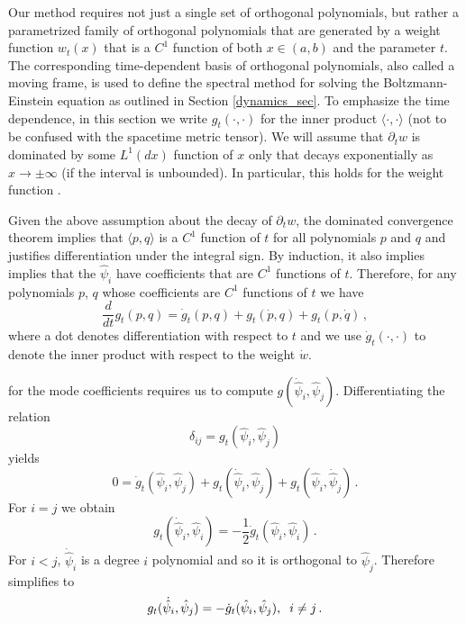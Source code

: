 \label{ortho-polynom-fam}
Our method requires not just a single set of orthogonal polynomials, but rather a parametrized family of orthogonal polynomials that are generated by a weight function $w_t(x)$ that is a $C^1$ function of both $x\in(a,b)$ and the parameter $t$. The corresponding time-dependent basis of orthogonal polynomials, also called a moving frame, is used to define the spectral method for solving the  Boltzmann-Einstein equation as outlined in Section \ref{dynamics_sec}.  To emphasize the time dependence, in this section we write $g_t(\cdot,\cdot)$ for the inner product $\langle\cdot,\cdot\rangle$ (not to be confused with the spacetime metric tensor).  We will assume that $\partial_t w$ is dominated by some $L^1(dx)$ function of $x$ only that decays exponentially as $x\rightarrow\pm\infty$ (if the interval is unbounded). In particular, this holds for the weight function .

Given the above assumption about the decay of $\partial_t w$, the dominated convergence theorem implies that $\langle p,q\rangle$ is a $C^1$ function of $t$ for all polynomials $p$ and $q$ and justifies  differentiation under the integral sign. By induction, it also implies implies that the $\hat\psi_i$ have coefficients that are $C^1$ functions of $t$. Therefore, for any polynomials $p$, $q$ whose coefficients are $C^1$ functions of $t$ we have
\begin{equation}
\frac{d}{dt}g_t( p,q)=\dot{g}_t(p,q)+g_t(\dot{p},q)+g_t( p,\dot{q})\,,
\end{equation}
where a dot denotes differentiation with respect to $t$ and we use $\dot{g}_t(\cdot,\cdot)$ to denote the inner product with respect to the weight $\dot{w}$.  

 for the mode coefficients requires us to compute $g(\dot{\hat\psi}_i,\hat\psi_j)$.  Differentiating the relation
\begin{equation}
\delta_{ij}=g_t(\hat\psi_i,\hat\psi_j)
\end{equation}
yields
\begin{equation}\label{ortho_deriv_eq}
0=\dot g_t(\hat\psi_i,\hat\psi_j)+g_t(\dot{\hat\psi}_i,\hat\psi_j)+g_t(\hat\psi_i,\dot{\hat\psi}_j)\,.
\end{equation}
For $i=j$ we obtain
\begin{equation}\label{norm_deriv_eq}
g_t(\dot{\hat\psi}_i,\hat\psi_i)=-\frac{1}{2}\dot{g}_t(\hat\psi_i,\hat\psi_i)\,.
\end{equation}
For $i<j$, $\dot{\hat\psi}_i$ is a degree $i$ polynomial and so it is orthogonal to $\hat\psi_j$. Therefore  simplifies to
\begin{equation}
g_t(\dot{\hat\psi}_i,\hat\psi_j)=-\dot{g}_t(\hat\psi_i,\hat\psi_j),\hspace{2mm} i\neq j\,.
\end{equation}


